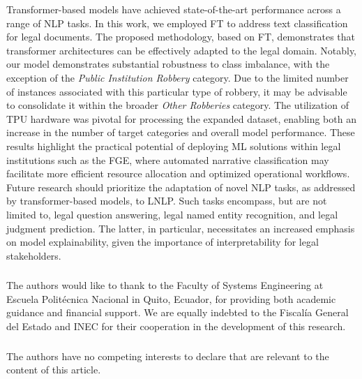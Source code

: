 \documentclass[runningheads]{llncs}
\begin{document}
Transformer-based models have achieved state-of-the-art performance
across a range of NLP tasks. In this work, we employed FT to address
text classification for legal documents. The proposed methodology,
based on FT, demonstrates that transformer architectures can be
effectively adapted to the legal domain. Notably, our model
demonstrates substantial robustness to class imbalance, with the
exception of the \textit{Public Institution Robbery} category. Due to
the limited number of instances associated with this particular type
of robbery, it may be advisable to consolidate it within the broader
\textit{Other Robberies} category. The utilization of TPU hardware was
pivotal for processing the expanded dataset, enabling both an increase
in the number of target categories and overall model
performance. These results highlight the practical potential of
deploying ML solutions within legal institutions such as the FGE,
where automated narrative classification may facilitate more efficient
resource allocation and optimized operational workflows. Future
research should prioritize the adaptation of novel NLP tasks, as
addressed by transformer-based models, to LNLP. Such tasks encompass,
but are not limited to, legal question answering, legal named entity
recognition, and legal judgment prediction. The latter, in particular,
necessitates an increased emphasis on model explainability, given the
importance of interpretability for legal stakeholders.

\begin{credits}
  \subsubsection{\ackname} The authors would like to thank to the
  Faculty of Systems Engineering at Escuela Politécnica Nacional in
  Quito, Ecuador, for providing both academic guidance and financial
  support. We are equally indebted to the Fiscalía General del Estado
  and INEC for their cooperation in the development of this research.

\subsubsection{\discintname}
The authors have no competing interests to declare that are relevant
to the content of this article.
\end{credits}
\newpage
%
%


%
\end{document}
